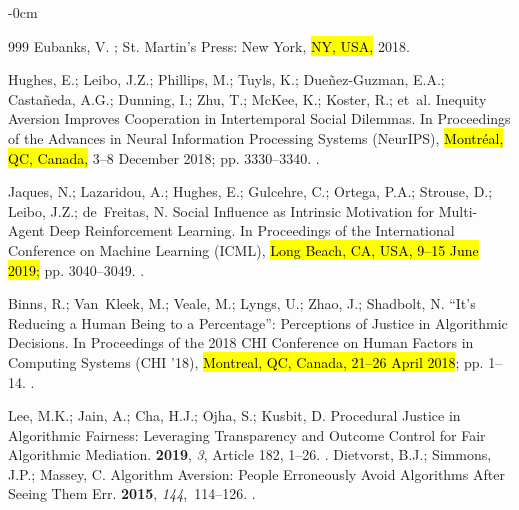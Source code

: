\documentclass[mca,article,accept,pdftex,oneauthor]{Definitions/mdpi}
\begin{document}
\begin{adjustwidth}{-\extralength}{0cm}
\begin{thebibliography}{999}
Eubanks, V.
; St. Martin's Press: New York, \hl{NY, USA,} 2018.

Hughes, E.; Leibo, J.Z.; Phillips, M.; Tuyls, K.; Due{\~n}ez-Guzman, E.A.;
  Casta{\~n}eda, A.G.; Dunning, I.; Zhu, T.; McKee, K.; Koster, R.;  et~al.
\newblock Inequity Aversion Improves Cooperation in Intertemporal Social
  Dilemmas.
\newblock In Proceedings of the Advances in Neural Information Processing
  Systems (NeurIPS),  \hl{Montréal, QC, Canada,}  3--8 December 2018; pp. 3330--3340.
.

Jaques, N.; Lazaridou, A.; Hughes, E.; Gulcehre, C.; Ortega, P.A.; Strouse, D.;
  Leibo, J.Z.; de~Freitas, N.
\newblock Social Influence as Intrinsic Motivation for Multi-Agent Deep
  Reinforcement Learning.
\newblock In Proceedings of the International Conference on Machine Learning
  (ICML),   \hl{Long Beach, CA, USA, 9--15 June 2019;} pp. 3040--3049.
.

Binns, R.; Van~Kleek, M.; Veale, M.; Lyngs, U.; Zhao, J.; Shadbolt, N.
\newblock ``It's Reducing a Human Being to a Percentage'': Perceptions of
  Justice in Algorithmic Decisions.
\newblock In Proceedings of the 2018 CHI Conference on Human Factors in
  Computing Systems (CHI '18), \hl{Montreal, QC, Canada, 21--26 April 2018}; pp. 1--14.
.

Lee, M.K.; Jain, A.; Cha, H.J.; Ojha, S.; Kusbit, D.
\newblock Procedural Justice in Algorithmic Fairness: Leveraging Transparency
  and Outcome Control for Fair Algorithmic Mediation.
 {\bf 2019}, {\em 3}, Article 182, 1--26.
.
Dietvorst, B.J.; Simmons, J.P.; Massey, C.
\newblock Algorithm Aversion: People Erroneously Avoid Algorithms After Seeing
  Them Err.
 {\bf 2015}, {\em
  144},~114--126.
.


\end{thebibliography}
\end{adjustwidth}
\end{document}
